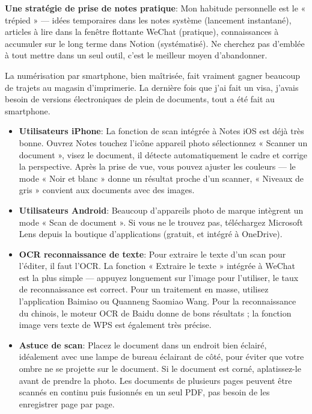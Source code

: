 \textbf{Une stratégie de prise de notes pratique}: Mon habitude personnelle est le « trépied » — idées temporaires dans les notes système (lancement instantané), articles à lire dans la fenêtre flottante WeChat (pratique), connaissances à accumuler sur le long terme dans Notion (systématisé). Ne cherchez pas d'emblée à tout mettre dans un seul outil, c'est le meilleur moyen d'abandonner.


La numérisation par smartphone, bien maîtrisée, fait vraiment gagner beaucoup de trajets au magasin d'imprimerie. La dernière fois que j'ai fait un visa, j'avais besoin de versions électroniques de plein de documents, tout a été fait au smartphone.

\begin{itemize}
  \item \textbf{Utilisateurs iPhone}: La fonction de scan intégrée à Notes iOS est déjà très bonne. Ouvrez Notes touchez l'icône appareil photo sélectionnez « Scanner un document », visez le document, il détecte automatiquement le cadre et corrige la perspective. Après la prise de vue, vous pouvez ajuster les couleurs — le mode « Noir et blanc » donne un résultat proche d'un scanner, « Niveaux de gris » convient aux documents avec des images.
  \item \textbf{Utilisateurs Android}: Beaucoup d'appareils photo de marque intègrent un mode « Scan de document ». Si vous ne le trouvez pas, téléchargez Microsoft Lens depuis la boutique d'applications (gratuit, et intégré à OneDrive).
  \item \textbf{OCR reconnaissance de texte}: Pour extraire le texte d'un scan pour l'éditer, il faut l'OCR. La fonction « Extraire le texte » intégrée à WeChat est la plus simple — appuyez longuement sur l'image pour l'utiliser, le taux de reconnaissance est correct. Pour un traitement en masse, utilisez l'application Baimiao ou Quanneng Saomiao Wang. Pour la reconnaissance du chinois, le moteur OCR de Baidu donne de bons résultats ; la fonction image vers texte de WPS est également très précise.
  \item \textbf{Astuce de scan}: Placez le document dans un endroit bien éclairé, idéalement avec une lampe de bureau éclairant de côté, pour éviter que votre ombre ne se projette sur le document. Si le document est corné, aplatissez-le avant de prendre la photo. Les documents de plusieurs pages peuvent être scannés en continu puis fusionnés en un seul PDF, pas besoin de les enregistrer page par page.
\end{itemize}

